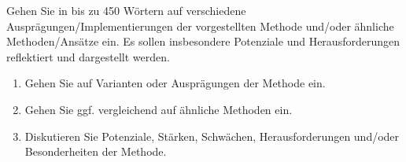 \documentclass[
          a4paper,
        ]{article}
\begin{document}
Gehen Sie in bis zu 450 Wörtern auf verschiedene
Ausprägungen/Implementierungen der vorgestellten Methode und/oder
ähnliche Methoden/Ansätze ein. Es sollen insbesondere Potenziale und
Herausforderungen reflektiert und dargestellt werden.

\begin{enumerate}
\def\labelenumi{\alph{enumi}.}
\item
  Gehen Sie auf Varianten oder Ausprägungen der Methode ein.
\item
  Gehen Sie ggf. vergleichend auf ähnliche Methoden ein.
\item
  Diskutieren Sie Potenziale, Stärken, Schwächen, Herausforderungen
  und/oder Besonderheiten der Methode.
\end{enumerate}
\end{document}
